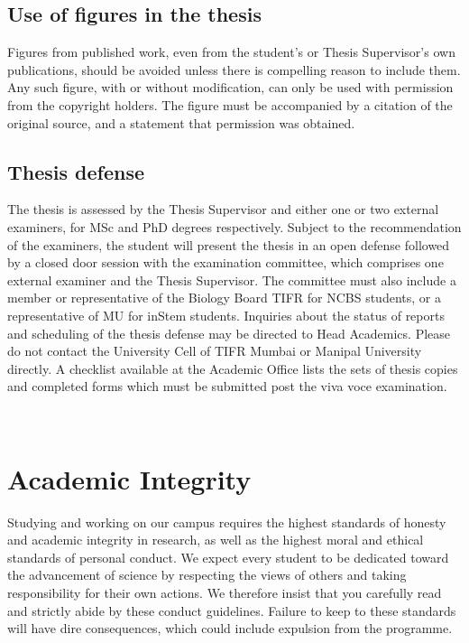 \documentclass[a4paper,10pt]{article}
\begin{document}
\subsection{Use of figures in the thesis} 
Figures from published work, even from the student’s or
Thesis Supervisor’s own publications, should be avoided unless there is compelling reason
to include them. Any such figure, with or without modification, can only be used with
permission from the copyright holders. The figure must be accompanied by a citation of the
original source, and a statement that permission was obtained.

\subsection{Thesis defense}
The thesis is assessed by the Thesis Supervisor and either one or two
external examiners, for MSc and PhD degrees respectively. Subject to the recommendation
of the examiners, the student will present the thesis in an open defense followed by a closed
door session with the examination committee, which comprises one external examiner and
the Thesis Supervisor. The committee must also include a member or representative of the
Biology Board TIFR for NCBS students, or a representative of MU for inStem students.
Inquiries about the status of reports and scheduling of the thesis defense may be directed to
Head Academics. Please do not contact the University Cell of TIFR Mumbai or Manipal
University directly. A checklist available at the Academic Office lists the sets of thesis
copies and completed forms which must be submitted post the viva voce examination.
	
  
\section{Academic Integrity}
Studying and working on our campus requires the highest standards of honesty and
academic integrity in research, as well as the highest moral and ethical standards of personal
conduct. We expect every student to be dedicated toward the advancement of science by
respecting the views of others and taking responsibility for their own actions. We therefore
insist that you carefully read and strictly abide by these conduct guidelines. Failure to keep
to these standards will have dire consequences, which could include expulsion from the
programme.
\end{document}
